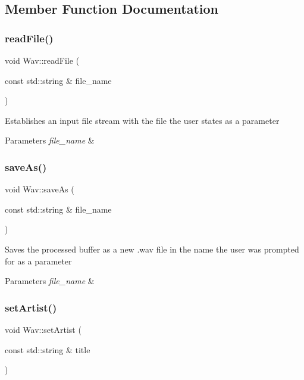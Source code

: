 \subsection{Member Function Documentation}
\mbox{\label{classWav_a8920a07a9210ed7de876a2f18768bbce}} 
\subsubsection{\texorpdfstring{read\+File()}{readFile()}}
{\footnotesize\ttfamily void Wav\+::read\+File (\begin{DoxyParamCaption}\item[{const std\+::string \&}]{file\+\_\+name }\end{DoxyParamCaption})}

Establishes an input file stream with the file the user states as a parameter 
\begin{DoxyParams}{Parameters}
{\em file\+\_\+name} & \\
\hline
\end{DoxyParams}
\mbox{\label{classWav_a67710ef5028074bbeccf84b662c89baa}} 
\subsubsection{\texorpdfstring{save\+As()}{saveAs()}}
{\footnotesize\ttfamily void Wav\+::save\+As (\begin{DoxyParamCaption}\item[{const std\+::string \&}]{file\+\_\+name }\end{DoxyParamCaption})}

Saves the processed buffer as a new .wav file in the name the user was prompted for as a parameter 
\begin{DoxyParams}{Parameters}
{\em file\+\_\+name} & \\
\hline
\end{DoxyParams}
\mbox{\label{classWav_a5542e8f6a3c8fc54b2acfb31683d52a6}} 
\subsubsection{\texorpdfstring{set\+Artist()}{setArtist()}}
{\footnotesize\ttfamily void Wav\+::set\+Artist (\begin{DoxyParamCaption}\item[{const std\+::string \&}]{title }\end{DoxyParamCaption})}


